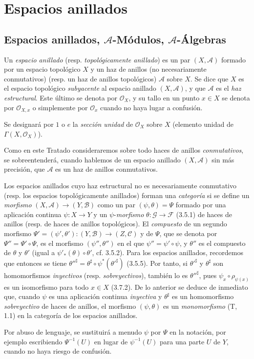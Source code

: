 \section{Espacios anillados}
\label{section:0.4-fr}

\subsection{Espacios anillados, $\mathcal{A}$-Módulos, $\mathcal{A}$-Álgebras}
\label{subsection:0.4.1-fr}

\begin{env}[4.1.1]
\label{0.4.1.1-fr}
Un \emph{espacio anillado} (resp. \emph{topológicamente anillado}) es un par
$(X,\mathcal{A})$ formado por un espacio topológico $X$ y un haz de anillos
(no necesariamente conmutativos) (resp. un haz de anillos topológicos)
$\mathcal{A}$ sobre $X$. Se dice que $X$ es el espacio
topológico \emph{subyacente} al espacio anillado $(X,\mathcal{A})$, y que
$\mathcal{A}$ es el \emph{haz estructural}. Este último se denota por
$\mathcal{O}_X$, y su tallo en un punto $x\in X$ se denota por $\mathcal{O}_{X,x}$
o simplemente por $\mathcal{O}_x$ cuando no haya lugar a confusión.

Se designará por $1$ o $e$ la \emph{sección unidad} de $\mathcal{O}_X$
sobre $X$ (elemento unidad de $\Gamma(X,\mathcal{O}_X)$).

Como en este Tratado consideraremos sobre todo haces de anillos
\emph{conmutativos}, se sobreentenderá, cuando hablemos de un espacio
anillado $(X,\mathcal{A})$ sin más precisión, que $\mathcal{A}$ es un haz
de anillos conmutativos.

Los espacios anillados cuyo haz estructural no es necesariamente conmutativo
(resp. los espacios topológicamente anillados) forman una \emph{categoría}
si se define un \emph{morfismo}
$(X,\mathcal{A})\to(Y,\mathcal{B})$ como un par
$(\psi,\theta)=\Psi$ formado por una aplicación continua $\psi:X\to Y$ y un
$\psi$-\emph{morfismo} $\theta:\mathcal{G}\to\mathcal{F}$ (3.5.1) de
haces de anillos (resp. de haces de anillos topológicos).
El \emph{compuesto} de un segundo morfismo
$\Psi'=(\psi',\theta'):(Y,\mathcal{B})\to(Z,\mathcal{C})$ y de $\Psi$, que se denota
por $\Psi''=\Psi'\circ\Psi$, es el morfismo $(\psi'',\theta'')$ en el que
$\psi''=\psi'\circ\psi$, y $\theta''$ es el compuesto de $\theta$ y $\theta'$
(igual a $\psi'_*(\theta)\circ\theta'$, cf. 3.5.2). Para los espacios
anillados, recordemos que entonces se tiene
$\theta''^\sharp=\theta^\sharp\circ\psi^*(\theta'^\sharp)$ (3.5.5). Por tanto, si
$\theta'^\sharp$ y $\theta^\sharp$ son homomorfismos \emph{inyectivos}
(resp. \emph{sobreyectivos}), también lo es $\theta''^\sharp$, pues
$\psi_x\circ\rho_{\psi(x)}$ es un isomorfismo para todo $x\in X$
(3.7.2). De lo anterior se deduce de inmediato que, cuando $\psi$ es una
aplicación continua \emph{inyectiva} y $\theta^\sharp$ es un homomorfismo
\emph{sobreyectivo} de haces de anillos, el morfismo
$(\psi,\theta)$ es un \emph{monomorfismo} (T, 1.1) en la categoría de los
espacios anillados.

Por abuso de lenguaje, se sustituirá a menudo $\psi$ por $\Psi$ en la
notación, por ejemplo escribiendo $\Psi^{-1}(U)$ en lugar de $\psi^{-1}(U)$
para una parte $U$ de $Y$, cuando no haya riesgo de confusión.
\end{env}

